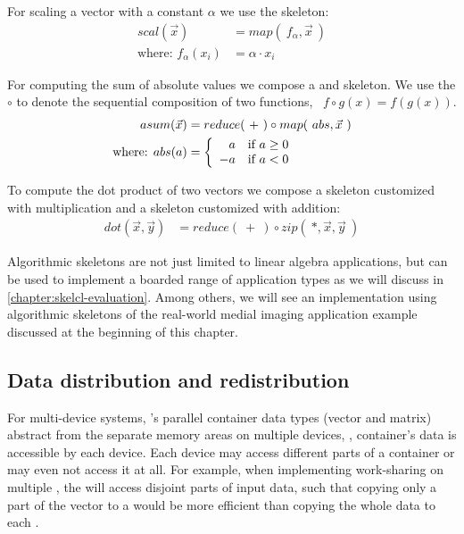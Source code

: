 For scaling a vector with a constant $\alpha$ we use the \map skeleton:
\begin{align*}
  scal(\vec{x}) &= map(\ f_{\alpha}, \vec{x}\ )\\
  \text{where: } f_{\alpha}(x_i) &= \alpha \cdot x_i
\end{align*}

\noindent
For computing the sum of absolute values we compose a \map and \reduce skeleton.
We use the $\circ$ to denote the sequential composition of two functions, \ie\ $f \circ g(x) = f(g(x))$.
\begin{align*}
  asum(\vec{x}) &= reduce(\ +\ ) \circ map(\ abs, \vec{x}\ )\\
  \text{where: } abs(a) &=
    \left\{
      \begin{array}{r l}
      a & \text{if } a \geq 0\\
      -a & \text{if } a < 0
      \end{array}
    \right.
\end{align*}

\noindent
To compute the dot product of two vectors we compose a \zip skeleton customized with multiplication and a \reduce skeleton customized with addition:
\begin{align*}
  dot(\vec{x}, \vec{y}) &= reduce(\ +\ ) \circ zip(\ *, \vec{x}, \vec{y}\ )
\end{align*}

\noindent
Algorithmic skeletons are not just limited to linear algebra applications, but can be used to implement a boarded range of application types as we will discuss in \autoref{chapter:skelcl-evaluation}.
Among others, we will see an implementation using algorithmic skeletons of the real-world medial imaging application example discussed at the beginning of this chapter.


\subsection{Data distribution and redistribution}
\label{section:skelcl-programming-model:distribution}

For multi-device systems, \SkelCL's parallel container data types (vector and matrix) abstract from the separate memory areas on multiple \OpenCL devices, \ie, container's data is accessible by each device.
Each device may access different parts of a container or may even not access it at all.
For example, when implementing work-sharing on multiple \GPUs, the \GPUs will access disjoint parts of input data, such that copying only a part of the vector to a \GPU would be more efficient than copying the whole data to each \GPU.

